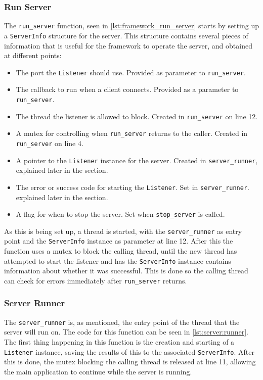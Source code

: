 \subsubsection{Run Server}
The \lstinline|run_server| function, seen in \autoref{lst:framework_run_server} starts by setting up a \lstinline|ServerInfo| structure for the server. This structure contains several
pieces of information that is useful for the framework to operate the server, and obtained at different points:
\begin{itemize}
\item The port the \lstinline|Listener| should use. Provided as parameter to \lstinline|run_server|.
\item The callback to run when a client connects. Provided as a parameter to \lstinline|run_server|.
\item The thread the listener is allowed to block. Created in \lstinline|run_server| on line 12.
\item A mutex for controlling when \lstinline|run_server| returns to the caller. Created in \lstinline|run_server| on line 4.
\item A pointer to the \lstinline|Listener| instance for the server. Created in \lstinline|server_runner|, explained later in the section.
\item The error or success code for starting the \lstinline|Listener|. Set in \lstinline|server_runner|. explained later in the section.
\item A flag for when to stop the server. Set when \lstinline|stop_server| is called.
\end{itemize}
As this is being set up, a thread is started, with the \lstinline|server_runner| as entry point and the \lstinline|ServerInfo| instance as parameter at line 12. After this the function uses a mutex
to block the calling thread, until the new thread has attempted to start the listener and has the \lstinline|ServerInfo| instance contains information about whether it was successful.
This is done so the calling thread can check for errors immediately after \lstinline|run_server| returns.



\subsubsection{Server Runner}
The \lstinline|server_runner| is, as mentioned, the entry point of the thread that the server will run on. The code for this function can be seen in \autoref{lst:server:runner}.
The first thing happening in this function is the creation and starting of a \lstinline|Listener| instance, saving the results of this to the associated \lstinline|ServerInfo|.
After this is done, the mutex blocking the calling thread is released at line 11, allowing the main application to continue while the server is running.

